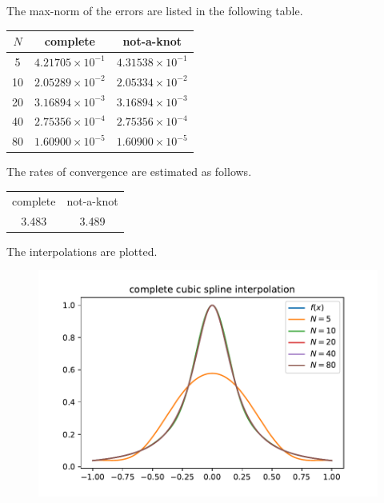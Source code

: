 \documentclass[12pt]{article}
\begin{document}
        The max-norm of the errors are listed in the following table.
        \begin{table}[H]
            \centering
            \begin{tabular}{c | c c}
                \(N\) & complete & not-a-knot \\
                \hline
                5 &  \(4.21705\times 10^{-1}\) & \(4.31538\times 10^{-1}\) \\
                10 & \(2.05289\times 10^{-2}\) & \(2.05334\times 10^{-2}\) \\ 
                20 & \(3.16894\times 10^{-3}\) & \(3.16894\times 10^{-3}\) \\
                40 & \(2.75356\times 10^{-4}\) & \(2.75356\times 10^{-4}\) \\
                80 & \(1.60900\times 10^{-5}\) & \(1.60900\times 10^{-5}\) \\
            \end{tabular}
        \end{table}
        The rates of convergence are estimated as follows.
        \begin{table}[H]
            \centering
            \begin{tabular}{c c}
                complete & not-a-knot \\
                3.483 & 3.489
            \end{tabular}
        \end{table}
        The interpolations are plotted.
        \begin{figure}[H]
            \centering
            \includegraphics{pics/B_complete}
        \end{figure}
\end{document}
